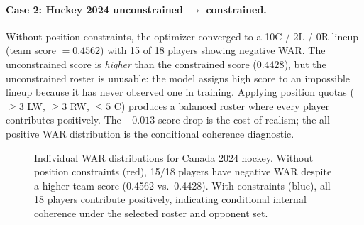 \documentclass[11pt,letterpaper]{article}
\begin{document}
\paragraph{Case 2: Hockey 2024 unconstrained $\to$ constrained.}
Without position constraints, the optimizer converged to a 10C / 2L / 0R
lineup (team score $= 0.4562$) with 15 of 18 players showing negative
WAR. The unconstrained score is \emph{higher} than the constrained
score ($0.4428$), but the unconstrained roster is unusable: the model
assigns high score to an impossible lineup because it has never
observed one in training. Applying position quotas ($\geq 3$ LW,
$\geq 3$ RW, $\leq 5$ C) produces a balanced roster where every
player contributes positively. The $-0.013$ score drop is the cost of
realism; the all-positive WAR distribution is the conditional coherence
diagnostic.

\begin{figure}[htbp]
  \centering
  \caption{Individual WAR distributions for Canada 2024 hockey. Without
    position constraints (red), 15/18 players have negative WAR despite a
    higher team score (0.4562 vs.\ 0.4428). With constraints (blue), all
    18 players contribute positively, indicating conditional internal
    coherence under the selected roster and opponent set.}
  \label{fig:war-distribution}
\end{figure}
\end{document}
